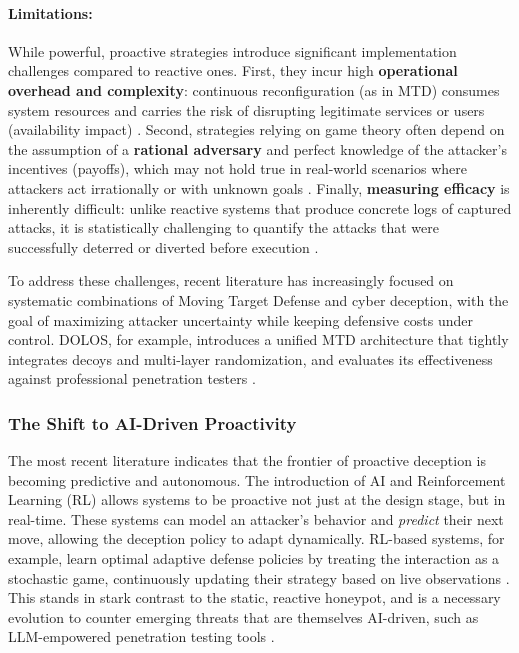 \paragraph{Limitations:} While powerful, proactive strategies introduce significant implementation challenges
compared to reactive ones. First, they incur high \textbf{operational overhead and complexity}: continuous
reconfiguration (as in MTD) consumes system resources and carries the risk of disrupting legitimate services
or users (availability impact) \cite{jajodia2011moving,rowe2016introduction}. Second, strategies relying
on game theory often depend on the assumption of a \textbf{rational adversary} and perfect knowledge
of the attacker's incentives (payoffs), which may not hold true in real-world scenarios where attackers
act irrationally or with unknown goals \cite{pawlick2019game}. Finally, \textbf{measuring efficacy}
is inherently difficult: unlike reactive systems that produce concrete logs of captured attacks, it is
statistically challenging to quantify the attacks that were successfully deterred or diverted before
execution \cite{ferguson2021examining}.

To address these challenges, recent literature has increasingly focused on systematic combinations of Moving
Target Defense and cyber deception, with the goal of maximizing attacker uncertainty
while keeping defensive costs under control. DOLOS, for example, introduces
a unified MTD architecture that tightly integrates decoys and multi-layer
randomization, and evaluates its effectiveness against professional penetration
testers \cite{dolos2023}.

\subsubsection{The Shift to AI-Driven Proactivity}

The most recent literature indicates that the frontier of proactive deception is becoming predictive
and autonomous. The introduction of AI and Reinforcement Learning (RL) allows systems to be proactive
not just at the design stage, but in real-time. These systems can model an attacker's behavior and
\textit{predict} their next move, allowing the deception policy to adapt dynamically. RL-based systems,
for example, learn optimal adaptive defense policies by treating the interaction as a stochastic game,
continuously updating their strategy based on live observations \cite{hammad2024deep}. This stands in
stark contrast to the static, reactive honeypot, and is a necessary evolution to counter emerging
threats that are themselves AI-driven, such as LLM-empowered penetration testing tools \cite{deng2023pentestgpt,fang2024llm}.

